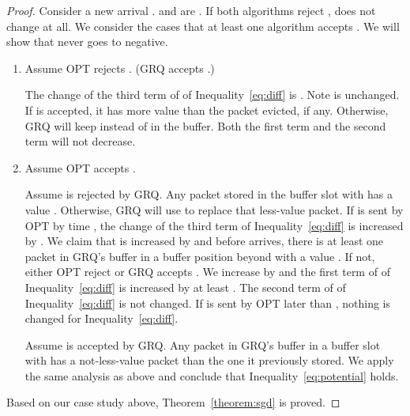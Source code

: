 \documentclass[final, 11pt]{article}
\begin{document}
\begin{proof}
Consider a new arrival .  and  are . If both algorithms reject ,  does not change at all. We consider the cases that at least one algorithm accepts . We will show that  never goes to negative.

\begin{enumerate}
\item Assume OPT rejects . (GRQ accepts .)

The change of the third term of  of Inequality~\ref{eq:diff} is . Note  is unchanged. If  is accepted, it has more value than the packet  evicted, if any. Otherwise, GRQ will keep  instead of  in the buffer. Both the first term and the second term will not decrease.

\item Assume OPT accepts .

Assume  is rejected by GRQ. Any packet stored in the buffer slot  with  has a value . Otherwise, GRQ will use  to replace that less-value packet. If  is sent by OPT by time , the change of the third term of Inequality~\ref{eq:diff} is increased by . We claim that  is increased by  and before  arrives, there is at least one packet in GRQ's buffer in a buffer position beyond  with a value . If not, either OPT reject  or GRQ accepts . We increase  by  and the first term of  of Inequality~\ref{eq:diff} is increased by at least . The second term of  of Inequality~\ref{eq:diff} is not changed. If  is sent by OPT later than , nothing is changed for Inequality~\ref{eq:diff}.

Assume  is accepted by GRQ. Any packet in GRQ's buffer in a buffer slot  with  has a not-less-value packet than the one it previously stored. We apply the same analysis as above and conclude that Inequality~\ref{eq:potential} holds.
\end{enumerate}



Based on our case study above, Theorem~\ref{theorem:sgd} is proved. 
\end{proof}





\end{document}
